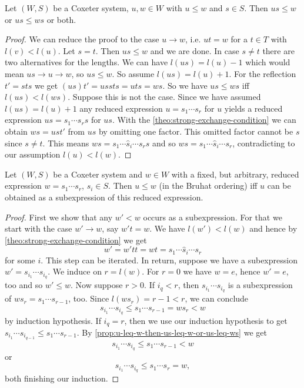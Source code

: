 \begin{prop}
	Let $(W,S)$ be a Coxeter system, $u,w \in W$ with $u \leq w$ and $s \in S$. Then $us \leq w$ or $us \leq ws$ or both.

	\begin{proof}
		We can reduce the proof to the case $u \to w$, i.e. $ut = w$ for a $t \in T$ with $l(v) < l(u)$. Let $s = t$. Then $us \leq w$ and we are done. In case $s \neq t$ there are two alternatives for the lengths. We can have $l(us) = l(u) - 1$ which would mean $us \to u \to w$, so $us \leq w$. So assume $l(us) = l(u) + 1$. For the reflection $t' = sts$ we get $(us)t' = ussts = uts = ws$. So we have $us \leq ws$ iff $l(us) < l(ws)$. Suppose this is not the case. Since we have assumed $l(us) = l(u) + 1$ any reduced expression $u = s_1 \cdots s_r$ for $u$ yields a reduced expression $us = s_1 \cdots s_r s$ for $us$. With the \ref{theo:strong-exchange-condition} we can obtain $ws = ust'$ from $us$ by omitting one factor. This omitted factor cannot be $s$ since $s \neq t$. This means $ws = s_1 \cdots \hat s_i \cdots s_r s$ and so $ws = s_1 \cdots \hat s_i \cdots s_r$, contradicting to our assumption $l(u) < l(w)$.
	\end{proof}
\end{prop}

\begin{theo}
	Let $(W,S)$ be a Coxeter system and $w \in W$ with a fixed, but arbitrary, reduced expression $w = s_1 \cdots s_r$, $s_i \in S$. Then $u \leq w$ (in the Bruhat ordering) iff $u$ can be obtained as a subexpression of this reduced expression.

	\begin{proof}
		First we show that any $w' < w$ occurs as a subexpression. For that we start with the case $w' \to w$, say $w't = w$. We have $l(w') < l(w)$ and hence by \ref{theo:strong-exchange-condition} we get
		$$ w' = w'tt = wt = s_1 \cdots \hat s_i \cdots s_r $$
		for some $i$. This step can be iterated. In return, suppose we have a subexpression $w' = s_{i_1} \cdots s_{i_q}$. We induce on $r = l(w)$. For $r = 0$ we have $w = e$, hence $w' = e$, too and so $w' \leq w$. Now suppose $r > 0$. If $i_q < r$, then $s_{i_1} \cdots s_{i_q}$ is a subexpression of $w s_r = s_1 \cdots s_{r-1}$, too. Since $l(w s_r) = r-1 < r$, we can conclude
		$$ s_{i_1} \cdots s_{i_q} \leq s_1 \cdots s_{r-1} = w s_r < w $$
		by induction hypothesis. If $i_q = r$, then we use our induction hypothesis to get $s_{i_1} \cdots s_{i_{q-1}} \leq s_1 \cdots s_{r-1}$. By \ref{prop:u-leq-w-then-us-leq-w-or-us-leq-ws} we get
		$$ s_{i_1} \cdots s_{i_q} \leq s_1 \cdots s_{r-1} < w $$
		or
		$$ s_{i_1} \cdots s_{i_q} \leq s_1 \cdots s_r = w, $$
		both finishing our induction.
	\end{proof}
\end{theo}

